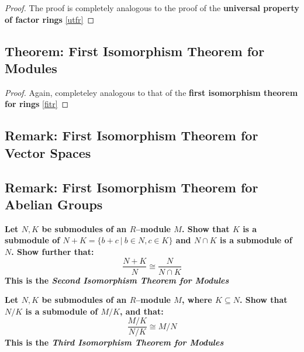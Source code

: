 \documentclass{exam}
\begin{document}
\begin{proof}

The proof is completely analogous to the proof of the \textbf{universal property of factor rings} \eqref{utfr}

\end{proof}

\subsection{Theorem: First Isomorphism Theorem for Modules}


\begin{proof}
Again, completeley analogous to that of the \textbf{first isomorphism theorem for rings} \eqref{fitr}
\end{proof}

\subsection{Remark: First Isomorphism Theorem for Vector Spaces}


\subsection{Remark: First Isomorphism Theorem for Abelian Groups}


\begin{questions}

\question \textbf{Let $N, K$ be submodules of an $R$–module $M$. Show that $K$ is a submodule of $N + K = \{b + c \ | \  b \in N, c \in K\}$ and $N \cap K$ is a submodule of $N$. Show further that:
\[
\frac{N+K}{N} \cong \frac{N}{N \cap K}
\]
This is the \textit{Second Isomorphism Theorem for Modules}}

\question \textbf{Let $N, K$ be submodules of an $R$–module $M$, where $K \subseteq N$. Show that $N/K$ is a submodule of $M/K$, and that: 
\[
\frac{M/K}{N/K} \cong M/N
\]
This is the \textit{Third Isomorphism Theorem for Modules}}
 
\end{questions}
\end{document}
